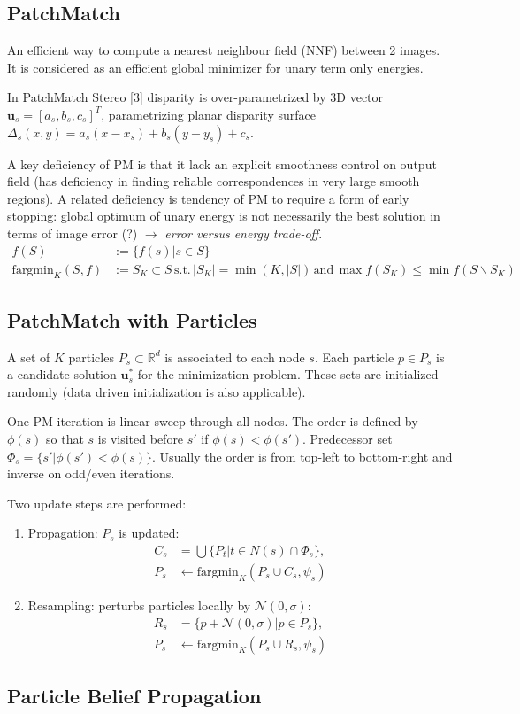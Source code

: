 \documentclass[a4paper,12pt]{article}
\begin{document}
\subsection*{PatchMatch}
An efficient way to compute a nearest neighbour field (NNF) between 2 images. It is considered as an efficient global minimizer for unary term only energies.

In PatchMatch Stereo [3] disparity is over-parametrized by 3D vector $\mathbf{u}_s = [ a_s, b_s, c_s ]^T$, parametrizing planar disparity surface $\Delta_s(x,y)=a_s(x-x_s)+b_s(y-y_s)+c_s$. 

A key deficiency of PM is that it lack an explicit smoothness control on output field (has deficiency in finding reliable correspondences in very large smooth regions).
A related deficiency is tendency of PM to require a form of early stopping: global optimum of unary energy is not necessarily the best solution in terms of image error (?) $\rightarrow$ \textit{error versus energy trade-off}. 
\begin{align*}
f(S) &:= \{f(s)|s \in S\} \\
\text{fargmin}_K(S,f) &:= S_K \subset S \, \text{s.t.} \, |S_K| = \min(K,|S|) \,\text{and}\, \max f(S_K) \leq \min f(S \backslash S_K)
\end{align*}

\subsection{PatchMatch with Particles}
A set of $K$ particles $P_s \subset \mathbb{R}^d$ is associated to each node $s$. Each particle $p \in P_s$ is a candidate solution $\mathbf{u}_s^{*}$ for the minimization problem. These sets are initialized randomly (data driven initialization is also applicable).

One PM iteration is linear sweep through all nodes. The order is defined by $\phi(s)$ so that $s$ is visited before $s'$ if $\phi(s) < \phi(s')$. Predecessor set $\Phi_s = \lbrace s'|\phi(s')<\phi(s) \rbrace$. Usually the order is from top-left to bottom-right and inverse on odd/even iterations.

Two update steps are performed:
\begin{enumerate}
\item Propagation: $P_s$ is updated: 
\begin{align*}
C_s &= \bigcup \lbrace P_t | t \in N(s) \cap \Phi_s \rbrace,\\ 
P_s &\leftarrow \text{fargmin}_K (P_s \cup C_s, \psi_s)
\end{align*}
\item Resampling: perturbs particles locally by $\mathcal{N}(0,\sigma)$:
\begin{align*}
R_s &= \lbrace p + \mathcal{N}(0,\sigma) | p \in P_s \rbrace, \\
P_s &\leftarrow \text{fargmin}_K (P_s \cup R_s, \psi_s)
\end{align*}
\end{enumerate}

\subsection{Particle Belief Propagation}
\end{document}
